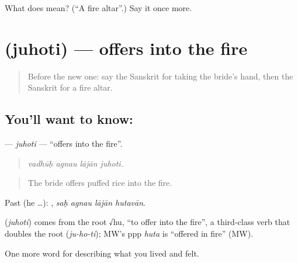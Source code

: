 \begin{tcolorbox}[breakable,colback=teal!4,colframe=teal!35!black,title={Before you move on}]
What does  mean? (\textquotedblleft{}A fire altar\textquotedblright{}.) Say it once more.
\end{tcolorbox}
\section[\texorpdfstring{\sk{जुहोति} (juhoti)}{जुहोति (juhoti)}]{ (juhoti) — offers into the fire}

\label{lesson:SA-C497-juhoti}



\begin{quote}
Before the new one: say the Sanskrit for taking the bride's hand, then the Sanskrit for a fire altar.
\end{quote}

\subsection*{You'll want to know: }
\textbf{} — \emph{juhoti} — \textquotedblleft{}offers into the fire\textquotedblright{}.

\begin{quote}
   
\end{quote}

\begin{quote}
\emph{vadhūḥ agnau lājān juhoti.}
\end{quote}

\begin{quote}
The bride offers puffed rice into the fire.
\end{quote}

Past (he …):    , \emph{saḥ agnau lājān hutavān}.

\begin{cousinweb}
\textbf{} (\emph{juhoti}) comes from the root √hu, \textquotedblleft{}to offer into the fire\textquotedblright{}, a third-class verb that doubles the root (\emph{ju-ho-ti}); MW's ppp \emph{huta} is \textquotedblleft{}offered in fire\textquotedblright{} (MW).
\end{cousinweb}

\begin{grammarlens}[title={What you've built}]
One more word for describing what you lived and felt.
\end{grammarlens}

